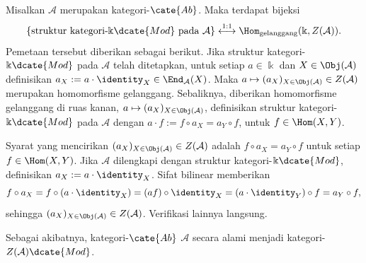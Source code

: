 \begin{proposisi}\label{prop:k-linear-center}
	Misalkan $\mathcal{A}$ merupakan kategori-$\cate{Ab}$. Maka terdapat
	bijeksi
	\[
		\left\{\text{struktur kategori-$\Bbbk\dcate{Mod}$ pada $\mathcal{A}$}\right\}
		\stackrel{1:1}{\longleftrightarrow}
		\Hom_{\text{gelanggang}}(\Bbbk,Z(\mathcal{A})).
	\]
	Pemetaan tersebut diberikan sebagai berikut. Jika struktur
	kategori-$\Bbbk\dcate{Mod}$ pada $\mathcal{A}$ telah ditetapkan, untuk setiap
	$a \in \Bbbk$ dan $X \in \Obj(\mathcal{A})$ definisikan
	$a_X := a \cdot \identity_X \in \End_{\mathcal{A}}(X)$. Maka
	$a \mapsto (a_X)_{X \in \Obj(\mathcal{A})} \in Z(\mathcal{A})$ merupakan
	homomorfisme gelanggang. Sebaliknya, diberikan homomorfisme gelanggang di
	ruas kanan,
	$a \mapsto (a_X)_{X \in \Obj(\mathcal{A})}$, definisikan struktur
	kategori-$\Bbbk\dcate{Mod}$ pada $\mathcal{A}$ dengan
	$a \cdot f := f \circ a_X = a_Y \circ f$, untuk
	$f \in \Hom(X,Y)$.
\end{proposisi}

\begin{bukti}
	Syarat yang mencirikan
	$(a_X)_{X \in \Obj(\mathcal{A})} \in Z(\mathcal{A})$ adalah
	$f \circ a_X = a_Y \circ f$ untuk setiap $f \in \Hom(X,Y)$. Jika
	$\mathcal{A}$ dilengkapi dengan struktur kategori-$\Bbbk\dcate{Mod}$,
	definisikan $a_X := a \cdot \identity_X$. Sifat bilinear memberikan
	\[
		f \circ a_X = f \circ (a \cdot \identity_X)
		= (a f) \circ \identity_X
		= (a \cdot \identity_Y) \circ f
		= a_Y \circ f,
	\]
	sehingga $(a_X)_{X \in \Obj(\mathcal{A})} \in Z(\mathcal{A})$.
	Verifikasi lainnya langsung.
\end{bukti}

Sebagai akibatnya, kategori-$\cate{Ab}$ $\mathcal{A}$ secara alami menjadi
kategori-$Z(\mathcal{A})\dcate{Mod}$.
